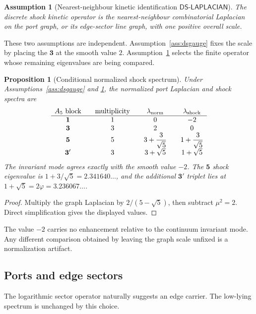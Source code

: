 \documentclass[11pt]{article}
\newtheorem{proposition}[theorem]{Proposition}
\newtheorem{assumption}[theorem]{Assumption}
\theoremstyle{remark}
\begin{document}
\begin{assumption}[Nearest-neighbour kinetic identification
\(\mathsf{DS\text{-}LAPLACIAN}\)]
\label{ass:dslaplacian}
The discrete shock kinetic operator is the nearest-neighbour combinatorial
Laplacian on the port graph, or its edge-sector line graph, with one positive
overall scale.
\end{assumption}

These two assumptions are independent. Assumption~\ref{ass:dsgauge} fixes the
scale by placing the \(\mathbf3\) at the smooth value \(2\).
Assumption~\ref{ass:dslaplacian} selects the finite operator whose remaining
eigenvalues are being compared.

\begin{proposition}[Conditional normalized shock spectrum]
\label{prop:spectrum}
Under Assumptions~\ref{ass:dsgauge} and \ref{ass:dslaplacian}, the normalized
port Laplacian and shock spectra are
\[
\begin{array}{c@{\qquad}c@{\qquad}c@{\qquad}c}
A_5\text{ block} & \text{multiplicity} &
\lambda_{\mathrm{norm}} & \lambda_{\mathrm{shock}}\\
\hline
\mathbf1 & 1 & 0 & -2\\
\mathbf3 & 3 & 2 & 0\\
\mathbf5 & 5 & 3+\dfrac3{\sqrt5} & 1+\dfrac3{\sqrt5}\\[3pt]
\mathbf3' & 3 & 3+\sqrt5 & 1+\sqrt5
\end{array}
\]
The invariant mode agrees exactly with the smooth value \(-2\). The
\(\mathbf5\) shock eigenvalue is \(1+3/\sqrt5=2.341640\ldots\), and the
additional \(\mathbf3'\) triplet lies at
\(1+\sqrt5=2\varphi=3.236067\ldots\).
\end{proposition}

\begin{proof}
Multiply the graph Laplacian by \(2/(5-\sqrt5)\), then subtract
\(\mu^2=2\). Direct simplification gives the displayed values.
\end{proof}

The value \(-2\) carries no enhancement relative to the continuum invariant
mode. Any different comparison obtained by leaving the graph scale unfixed
is a normalization artifact.

\subsection{Ports and edge sectors}

The logarithmic sector operator naturally suggests an edge carrier. The
low-lying spectrum is unchanged by this choice.
\end{document}
